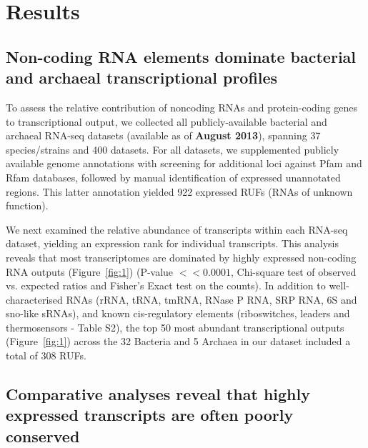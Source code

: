 \documentclass[10pt]{article}
\begin{document}
\section*{Results}

\subsection*{Non-coding RNA elements dominate bacterial and archaeal transcriptional profiles}

To assess the relative contribution of noncoding RNAs and
protein-coding genes to transcriptional output, we collected all
publicly-available bacterial and archaeal RNA-seq datasets (available
as of {\bf August 2013}), spanning 37 species/strains and 400
datasets. For all datasets, we supplemented publicly available genome
annotations with screening for additional loci against Pfam and Rfam
databases, followed by manual identification of expressed unannotated
regions. This latter annotation yielded 922 expressed RUFs (RNAs of
unknown function).

We next examined the relative abundance of transcripts within each
RNA-seq dataset, yielding an expression rank for individual
transcripts. This analysis reveals that most transcriptomes are
dominated by highly expressed non-coding RNA outputs
(Figure~\ref{fig:1}) (P-value $<< 0.0001$, Chi-square test of observed
vs. expected ratios and Fisher’s Exact test on the counts). In
addition to well-characterised RNAs (rRNA, tRNA, tmRNA, RNase P RNA,
SRP RNA, 6S and sno-like sRNAs), and known cis-regulatory elements
(riboswitches, leaders and thermosensors - Table S2), the top 50
most abundant transcriptional outputs (Figure~\ref{fig:1}) across the
32 Bacteria and 5 Archaea in our dataset included a total of 308 RUFs.

\subsection*{Comparative analyses reveal that highly expressed transcripts are often poorly conserved}
\end{document}
